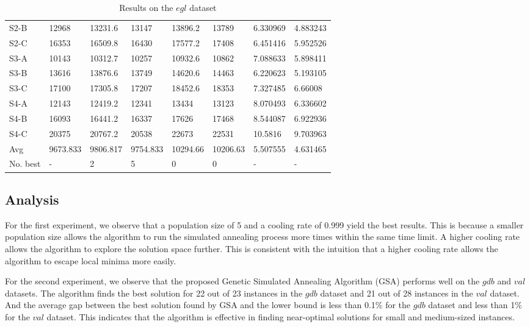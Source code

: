\documentclass[conference]{IEEEtran}
\begin{document}
\begin{table}[h]
{\begin{tabular}{llllllll}
            S2-B & 12968    & 13231.6  & 13147    & 13896.2  & 13789    & 6.330969 & 4.883243 \\
            S2-C & 16353    & 16509.8  & 16430    & 17577.2  & 17408    & 6.451416 & 5.952526 \\
            S3-A & 10143    & 10312.7  & 10257    & 10932.6  & 10862    & 7.088633 & 5.898411 \\
            S3-B & 13616    & 13876.6  & 13749    & 14620.6  & 14463    & 6.220623 & 5.193105 \\
            S3-C & 17100    & 17305.8  & 17207    & 18452.6  & 18353    & 7.327485 & 6.66008  \\
            S4-A & 12143    & 12419.2  & 12341    & 13434    & 13123    & 8.070493 & 6.336602 \\
            S4-B & 16093    & 16441.2  & 16337    & 17626    & 17468    & 8.544087 & 6.922936 \\
            S4-C & 20375    & 20767.2  & 20538    & 22673    & 22531    & 10.5816  & 9.703963 \\
            Avg      & 9673.833 & 9806.817 & 9754.833 & 10294.66 & 10206.63 & 5.507555 & 4.631465 \\
            No. best & -        & 2        & 5        & 0        & 0        & -        & -        \\
            \bottomrule
        \end{tabular}
    }
    \caption{Results on the $egl$ dataset}
    \label{tab:egl}
\end{table}

\subsection{Analysis}

For the first experiment, we observe that a population size of 5 and a cooling rate of 0.999 yield the best results.
This is because a smaller population size allows the algorithm to run the simulated annealing process more times within the same time limit.
A higher cooling rate allows the algorithm to explore the solution space further.
This is consistent with the intuition that a higher cooling rate allows the algorithm to escape local minima more easily.

For the second experiment, we observe that the proposed Genetic Simulated Annealing Algorithm (GSA) performs well on the $gdb$ and $val$ datasets.
The algorithm finds the best solution for 22 out of 23 instances in the $gdb$ dataset and 21 out of 28 instances in the $val$ dataset.
And the average gap between the best solution found by GSA and the lower bound is less than 0.1\% for the $gdb$ dataset and less than 1\% for the $val$ dataset.
This indicates that the algorithm is effective in finding near-optimal solutions for small and medium-sized instances.
\end{document}
